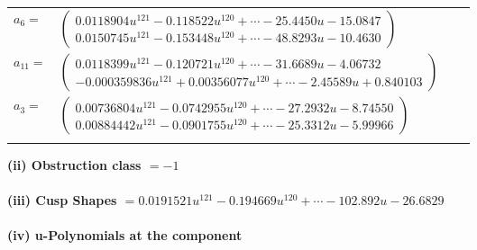 \documentclass[1p]{elsarticle_modified}
\theoremstyle{definition}
\begin{document}
\begin{tabular}{m{7pt} m{180pt} m{7pt} m{180pt} }
\flushright $a_{6}=$&$\begin{pmatrix}0.0118904 u^{121}-0.118522 u^{120}+\cdots-25.4450 u-15.0847\\0.0150745 u^{121}-0.153448 u^{120}+\cdots-48.8293 u-10.4630\end{pmatrix}$ \\
\flushright $a_{11}=$&$\begin{pmatrix}0.0118399 u^{121}-0.120721 u^{120}+\cdots-31.6689 u-4.06732\\-0.000359836 u^{121}+0.00356077 u^{120}+\cdots-2.45589 u+0.840103\end{pmatrix}$ \\
\flushright $a_{3}=$&$\begin{pmatrix}0.00736804 u^{121}-0.0742955 u^{120}+\cdots-27.2932 u-8.74550\\0.00884442 u^{121}-0.0901755 u^{120}+\cdots-25.3312 u-5.99966\end{pmatrix}$\\&\end{tabular}
\flushleft \textbf{(ii) Obstruction class $= -1$}\\~\\
\flushleft \textbf{(iii) Cusp Shapes $= 0.0191521 u^{121}-0.194669 u^{120}+\cdots-102.892 u-26.6829$}\\~\\
\newpage\renewcommand{\arraystretch}{1}
\flushleft \textbf{(iv) u-Polynomials at the component}\newline \\
\end{document}

